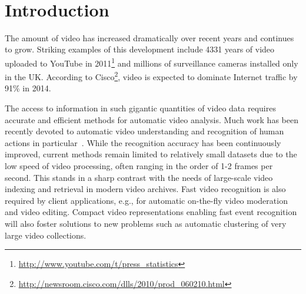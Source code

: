 \documentclass[10pt,twocolumn,letterpaper]{article}
\begin{document}
%
%



\mbox{}\vspace{-1.3cm}\\
\section{Introduction}

The amount of video has increased dramatically over recent years and continues to grow. Striking examples of this development include 4331 years of video uploaded to YouTube in 2011\footnote{\scriptsize \url{http://www.youtube.com/t/press\_statistics}} and millions of surveillance cameras installed only in the UK. According to Cisco\footnote{\scriptsize \url{http://newsroom.cisco.com/dlls/2010/prod_060210.html}}, video is expected to dominate Internet traffic by 91\% in 2014.

The access to information in such gigantic quantities of video data requires accurate and efficient methods for automatic video analysis. Much work has been recently devoted to automatic video understanding and recognition of human actions in particular~\cite{Laptev08,Liu11,Niebles10,Sadanand12,Schuldt04,Wang12}. While the recognition accuracy has been continuously improved, current methods remain limited to relatively small datasets due to the low speed of video processing, often ranging in the order of 1-2 frames per second. This stands in a sharp contrast with the needs of large-scale video indexing and retrieval in modern video archives. Fast video recognition is also required by client applications, e.g., for automatic on-the-fly video moderation and video editing. Compact video representations enabling fast event recognition will also foster solutions to new problems such as automatic clustering of very large video collections.
\end{document}
